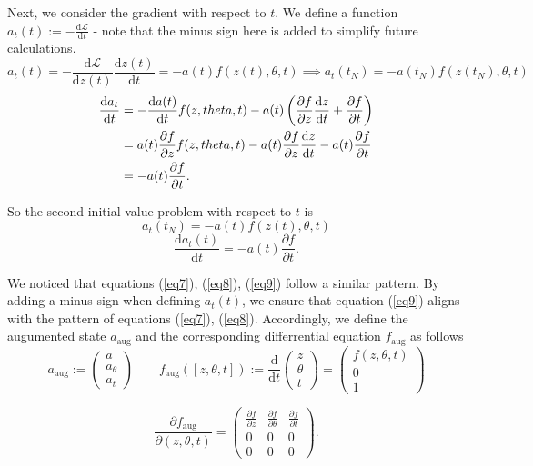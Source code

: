 \documentclass[a4paper,11pt,titlepage]{article}
\theoremstyle{definition}
\theoremstyle{plain}
\theoremstyle{remark}
\begin{document}
Next, we consider the gradient with respect to $t$. We define a function $a_t(t):=-\frac{\mathrm{d}\mathcal{L}}{\mathrm{d} t}$ - note that the minus sign here is added to simplify future calculations.
$$
a_t(t) = -\frac{\mathrm{d}\mathcal{L}}{\mathrm{d} z(t)}\frac{\mathrm{d} z(t)}{\mathrm{d}t}=-a(t)f\left(z(t),\theta, t\right)\implies a_t(t_N) = -a(t_N)f\left(z(t_N),\theta, t\right)
$$
\begin{align}
\frac{\mathrm{d}a_t}{\mathrm{d}t}&=-\frac{\mathrm{d}a(t)}{\mathrm{d}t}f(z,\theta,t)-a(t)\left(\frac{\partial f}{\partial z}\frac{\mathrm{d}z}{\mathrm{d}t}+\frac{\partial f}{\partial t}\right)\notag\\
&=a(t)\frac{\partial f}{\partial z}f(z,\theta,t)-a(t)\frac{\partial f}{\partial z}\frac{\mathrm{d}z}{\mathrm{d}t}-a(t)\frac{\partial f}{\partial t}\notag\\
&=-a(t)\frac{\partial f}{\partial t}.\notag
\end{align}

So the second initial value problem with respect to $t$ is 
$$a_t(t_N)=-a(t)f\left(z(t),\theta,t\right)$$
\begin{equation}\label{eq9}
    \frac{\mathrm{d}a_t(t)}{\mathrm{d}t} = -a(t)\frac{\partial f}{\partial t}.
\end{equation}

We noticed that equations (\ref{eq7}), (\ref{eq8}), (\ref{eq9}) follow a similar pattern. By adding a minus sign when defining $a_t(t)$, we ensure that equation (\ref{eq9}) aligns with the pattern of equations (\ref{eq7}), (\ref{eq8}). Accordingly, we define the augumented state $a_{\mathrm{aug}}$ and the corresponding differrential equation $f_{\mathrm{aug}}$ as follows
$$a_{\mathrm{aug}}:= \begin{pmatrix}a\\ a_\theta\\ a_t\end{pmatrix}\quad\quad f_{\mathrm{aug}}\left([z,\theta,t]\right):=\frac{\mathrm{d}}{\mathrm{d}t}\begin{pmatrix}z\\\theta\\ t\end{pmatrix}=\begin{pmatrix}f(z,\theta,t)\\0\\1\end{pmatrix}$$

\[
\frac{\partial f_{\mathrm{aug}}}{\partial (z, \theta, t)} = 
\begin{pmatrix}
\frac{\partial f}{\partial z} & \frac{\partial f}{\partial \theta} & \frac{\partial f}{\partial t} \\
0 & 0 & 0 \\
0 & 0 & 0 
\end{pmatrix}.
\]
\end{document}
